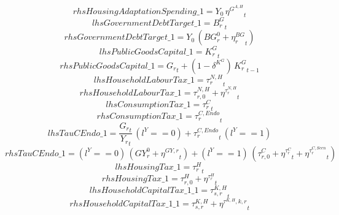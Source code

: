 \begin{dmath*}
rhsHousingAdaptationSpending\_1 = {{Y_0}}\, {{\eta^{G^{A,H}}}}_{t}
\end{dmath*}
\begin{dmath*}
lhsGovernmentDebtTarget\_1 = {{B^G_{r}}}_{t}
\end{dmath*}
\begin{dmath*}
rhsGovernmentDebtTarget\_1 = {{Y_0}}\, \left({{BG^0_r}}+{{\eta^{BG}_{r}}}_{t}\right)
\end{dmath*}
\begin{dmath*}
lhsPublicGoodsCapital\_1 = {{K^G_{r}}}_{t}
\end{dmath*}
\begin{dmath*}
rhsPublicGoodsCapital\_1 = {{G_{r}}}_{t}+\left(1-{{\delta^{K^{G}}}}\right)\, {{K^G_{r}}}_{t-1}
\end{dmath*}
\begin{dmath*}
lhsHouseholdLabourTax\_1 = {{\tau^{N,H}_{r}}}_{t}
\end{dmath*}
\begin{dmath*}
rhsHouseholdLabourTax\_1 = {{\tau^{N,H}_{r,0}}}+{{\eta^{\tau^{N,H}_{r}}}}_{t}
\end{dmath*}
\begin{dmath*}
lhsConsumptionTax\_1 = {{\tau^{C}_{r}}}_{t}
\end{dmath*}
\begin{dmath*}
rhsConsumptionTax\_1 = {{\tau^{C,Endo}_{r}}}_{t}
\end{dmath*}
\begin{dmath*}
lhsTauCEndo\_1 = \frac{{{G_{r}}}_{t}}{{{Y_r}}_{t}}\, \left({{l^{Y}}}==0\right)+{{\tau^{C,Endo}_{r}}}_{t}\, \left({{l^{Y}}}==1\right)
\end{dmath*}
\begin{dmath*}
rhsTauCEndo\_1 = \left({{l^{Y}}}==0\right)\, \left({{GY^0_r}}+{{\eta^{GY,r}}}_{t}\right)+\left({{l^{Y}}}==1\right)\, \left({{\tau^{C}_{r,0}}}+{{\eta^{\tau^C_{r}}}}_{t}+{{\eta^{\tau^{C,Scen}_{r}}}}_{t}\right)
\end{dmath*}
\begin{dmath*}
lhsHousingTax\_1 = {{\tau^{H}_{r}}}_{t}
\end{dmath*}
\begin{dmath*}
rhsHousingTax\_1 = {{\tau^{H}_{r,0}}}+{{\eta^{\tau^H_{r}}}}_{t}
\end{dmath*}
\begin{dmath*}
lhsHouseholdCapitalTax\_1\_1 = {{\tau^{K,H}_{s,r}}}_{t}
\end{dmath*}
\begin{dmath*}
rhsHouseholdCapitalTax\_1\_1 = {{\tau^{K,H}_{s,r}}}+{{\eta^{\tau^{K,H},k,r}}}_{t}
\end{dmath*}
